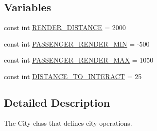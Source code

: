 \subsection*{Variables}
\begin{DoxyCompactItemize}
\item 
const int \hyperlink{city_8hh_ae64f34fc2d5f71f07cd3b6d6b9518215}{R\-E\-N\-D\-E\-R\-\_\-\-D\-I\-S\-T\-A\-N\-C\-E} = 2000
\item 
const int \hyperlink{city_8hh_ae9a58fdb539145f04f47e77582514552}{P\-A\-S\-S\-E\-N\-G\-E\-R\-\_\-\-R\-E\-N\-D\-E\-R\-\_\-\-M\-I\-N} = -\/500
\item 
const int \hyperlink{city_8hh_a96b3f3c6628cf7255e17e1b12f001e70}{P\-A\-S\-S\-E\-N\-G\-E\-R\-\_\-\-R\-E\-N\-D\-E\-R\-\_\-\-M\-A\-X} = 1050
\item 
const int \hyperlink{city_8hh_aedc95de80b52c2e078fac78e2c7a8df8}{D\-I\-S\-T\-A\-N\-C\-E\-\_\-\-T\-O\-\_\-\-I\-N\-T\-E\-R\-A\-C\-T} = 25
\end{DoxyCompactItemize}


\subsection{Detailed Description}
The City class that defines city operations. 

